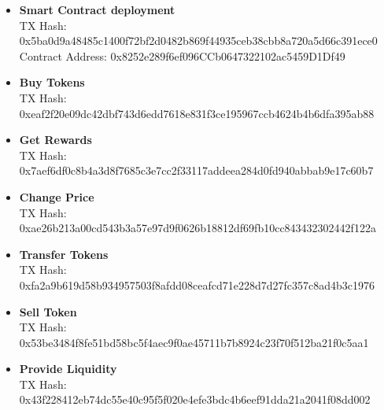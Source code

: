 \documentclass[12pt,a4paper]{article}
\begin{document}
\begin{itemize}
    \item \textbf{Smart Contract deployment}\\
    TX Hash: 0x5ba0d9a48485c1400f72bf2d0482b869f44935ceb38cbb8a720a5d66c391ece0 \\
    Contract Address: 0x8252e289f6ef096CCb0647322102ac5459D1Df49
    \item \textbf{Buy Tokens}\\
    TX Hash: 0xeaf2f20e09dc42dbf743d6edd7618e831f3ce195967ccb4624b4b6dfa395ab88
    \item \textbf{Get Rewards}\\
    TX Hash: 0x7aef6df0c8b4a3d8f7685c3e7cc2f33117addeea284d0fd940abbab9e17c60b7
    \item \textbf{Change Price}\\
    TX Hash: 0xae26b213a00cd543b3a57e97d9f0626b18812df69fb10cc843432302442f122a
    \item \textbf{Transfer Tokens}\\
    TX Hash: 0xfa2a9b619d58b934957503f8afdd08ceafcd71e228d7d27fc357c8ad4b3c1976
    \item \textbf{Sell Token}\\
    TX Hash: 0x53be3484f8fe51bd58bc5f4aec9f0ae45711b7b8924c23f70f512ba21f0c5aa1
    \item \textbf{Provide Liquidity}\\
    TX Hash: 0x43f228412eb74dc55e40c95f5f020e4efe3bdc4b6eef91dda21a2041f08dd002\\
\end{itemize}
\end{document}
